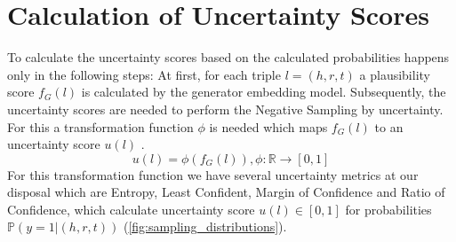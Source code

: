 \section{Calculation of Uncertainty Scores}
\label{sec:calculation_of_uncertainty_scores}
To calculate the uncertainty scores based on the calculated probabilities happens only in the following steps:
At first, for each triple $l = (h, r, t)$ a plausibility score $f_G(l)$ is calculated by the generator embedding model. 
Subsequently, the uncertainty scores are needed to perform the Negative Sampling by uncertainty.
For this a transformation function $\phi$ is needed which maps $f_G(l)$ to an uncertainty score $u(l)$ .
\begin{equation} \label{eqn:uncertainty_function}
    u(l) = \phi(f_G(l)), \phi: \mathbb{R} \rightarrow [0,1]
\end{equation}
For this transformation function we have several uncertainty metrics at our disposal which are Entropy, Least Confident, Margin of Confidence and Ratio of Confidence, which calculate uncertainty score $u(l) \in [0, 1]$ for probabilities $\mathbb{P}(y = 1 | (h,r,t))$ (\autoref{fig:sampling_distributions}).
